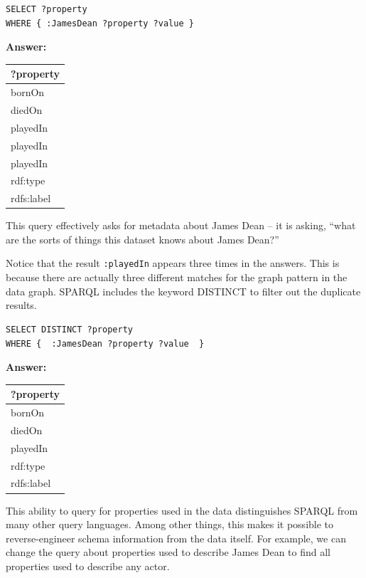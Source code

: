 \begin{lstlisting}
SELECT ?property
WHERE { :JamesDean ?property ?value }
\end{lstlisting}

\textbf{\textbf{Answer:}}

\begin{tabular}{|l|}
\hline
?property\\
\hline
bornOn\\
diedOn\\
playedIn\\
playedIn\\
playedIn\\
rdf:type\\
rdfs:label\\
\hline
\end{tabular}

This query effectively asks for metadata about James Dean -- it is
asking, ``what are the sorts of things this dataset knows about James
Dean?''

Notice that the result \texttt{:playedIn} appears three times in the answers.
This is because there are actually three different matches for the graph
pattern in the data graph. SPARQL includes the keyword DISTINCT to
filter out the duplicate results.


\begin{lstlisting}
SELECT DISTINCT ?property
WHERE {  :JamesDean ?property ?value  }
\end{lstlisting}

\textbf{\textbf{Answer:} }

\begin{tabular}{|l|}
\hline
?property\\
\hline
bornOn\\
diedOn\\
playedIn\\
rdf:type\\
rdfs:label\\
\hline
\end{tabular}

This ability to query for properties used in the data distinguishes
SPARQL from many other query languages. Among other things, this makes
it possible to reverse-engineer schema information from the data itself.
For example, we can change the query about properties used to describe
James Dean to find all properties used to describe any actor.

